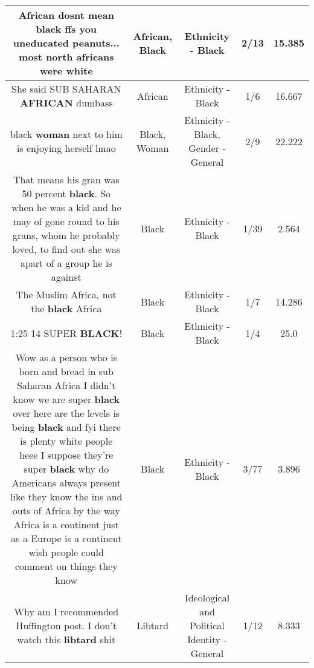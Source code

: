 \documentclass[11pt]{article}
\newlength\mylength
\begin{document}
\begin{center}
\begin{longtable}{|C{.65\mylength}|C{.30\mylength}|C{.12\mylength}|C{.12\mylength}|C{.12\mylength}|}
  \small African dosnt mean \textbf{black} ffs you uneducated peanuts... most north africans were white\normalsize   & African, Black & Ethnicity - Black & 2/13 & 15.385 \\  \hline
  \small She said SUB SAHARAN \textbf{AFRICAN} dumbass\normalsize   & African & Ethnicity - Black & 1/6 & 16.667 \\  \hline
  \small black \textbf{woman} next to him is enjoying herself lmao\normalsize   & Black, Woman & Ethnicity - Black, Gender - General & 2/9 & 22.222 \\  \hline
  \small That means his gran was 50 percent \textbf{black}. So when he was a kid and he may of gone round to his grans, whom he probably  loved, to find out she was apart of a group he is against\normalsize   & Black & Ethnicity - Black & 1/39 & 2.564 \\  \hline
  \small The Muslim Africa, not the \textbf{black} Africa\normalsize   & Black & Ethnicity - Black & 1/7 & 14.286 \\  \hline
  \small 1:25 14 SUPER \textbf{BLACK}!\normalsize   & Black & Ethnicity - Black & 1/4 & 25.0 \\  \hline
  \small Wow as a person who is born and bread in sub Saharan Africa I didn't know we are super \textbf{black} over here are the levels is being \textbf{black} and fyi there is plenty white people heee I suppose they're super \textbf{black} why do Americans always present like they know the ins and outs of Africa by the way Africa is a continent just as a Europe is a continent wish people could comment on things they know\normalsize   & Black & Ethnicity - Black & 3/77 & 3.896 \\  \hline
  \small Why am I recommended Huffington post. I don't watch this \textbf{libtard} shit\normalsize   & Libtard &  Ideological and Political Identity - General & 1/12 & 8.333 \\  \hline

\end{longtable}
\end{center}
\end{document}
